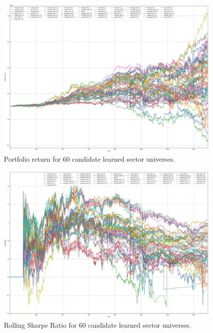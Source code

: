 \documentclass[../main.tex]{subfiles}
\begin{document}
\newpage
\begin{figure}
    \centering
    \includegraphics[width=\linewidth]{images/all_portfolio_return.png}
    \caption{Portfolio return for 60 candidate learned sector universes.}
    \label{fig:appendix_backtest:portfolio_return}
\end{figure}

\newpage
\begin{figure}
    \centering
    \includegraphics[width=\linewidth]{images/all_sharpe_ratio.png}
    \caption{Rolling Sharpe Ratio for 60 candidate learned sector universes.}
    \label{fig:appendix_backtest:sharpe_ratio}
\end{figure}
\end{document}
